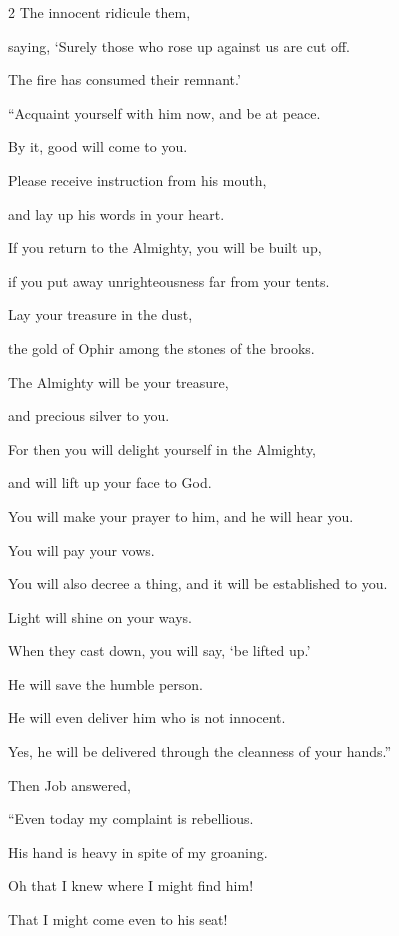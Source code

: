 \begin{multicols}{2}
	The innocent ridicule them,
	
	\myverse{}saying, ‘Surely those who rose up against us are cut off.
	
	The fire has consumed their remnant.’
	
	\vspace{\baselineskip}
	
	\myverse{}“Acquaint yourself with him now, and be at peace.
	
	By it, good will come to you.
	
	\myverse{}Please receive instruction from his mouth,
	
	and lay up his words in your heart.
	
	\myverse{}If you return to the Almighty, you will be built up,
	
	if you put away unrighteousness far from your tents.
	
	\myverse{}Lay your treasure in the dust,
	
	the gold of Ophir among the stones of the brooks.
	
	\myverse{}The Almighty will be your treasure,
	
	and precious silver to you.
	
	\myverse{}For then you will delight yourself in the Almighty,
	
	and will lift up your face to God.
	
	\myverse{}You will make your prayer to him, and he will hear you.
	
	You will pay your vows.
	
	\myverse{}You will also decree a thing, and it will be established to
	you.
	
	Light will shine on your ways.
	
	\myverse{}When they cast down, you will say, ‘be lifted up.’
	
	He will save the humble person.
	
	\myverse{}He will even deliver him who is not innocent.
	
	Yes, he will be delivered through the cleanness of your hands.”
	
	
	\mychapter{} \myverse*{}Then Job answered,
	
\quad\quad	\myverse{}“Even today my complaint is rebellious.
	
	His hand is heavy in spite of my groaning.
	
	\myverse{}Oh that I knew where I might find him!
	
	That I might come even to his seat!
	

\end{multicols}

